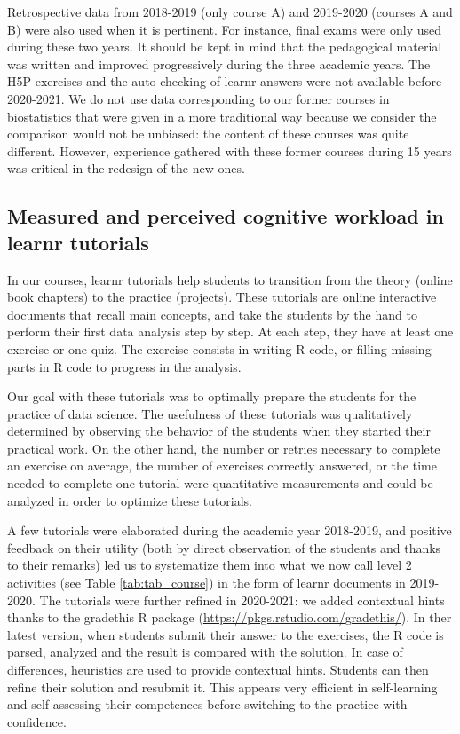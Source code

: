 \documentclass{aims}
\theoremstyle{definition}
\begin{document}
Retrospective data from 2018-2019 (only course A)
\cite{Grosjeandataset2018} and 2019-2020 (courses A and B)
\cite{Grosjeandataset2019} were also used when it is pertinent. For
instance, final exams were only used during these two years. It should
be kept in mind that the pedagogical material was written and improved
progressively during the three academic years. The H5P exercises and the
auto-checking of learnr answers were not available before 2020-2021. We
do not use data corresponding to our former courses in biostatistics
that were given in a more traditional way because we consider the
comparison would not be unbiased: the content of these courses was quite
different. However, experience gathered with these former courses during
15 years was critical in the redesign of the new ones.

\hypertarget{measured-and-perceived-cognitive-workload-in-learnr-tutorials-1}{%
\subsection{Measured and perceived cognitive workload in learnr
tutorials}\label{measured-and-perceived-cognitive-workload-in-learnr-tutorials-1}}

In our courses, learnr tutorials help students to transition from the
theory (online book chapters) to the practice (projects). These
tutorials are online interactive documents that recall main concepts,
and take the students by the hand to perform their first data analysis
step by step. At each step, they have at least one exercise or one quiz.
The exercise consists in writing R code, or filling missing parts in R
code to progress in the analysis.

Our goal with these tutorials was to optimally prepare the students for
the practice of data science. The usefulness of these tutorials was
qualitatively determined by observing the behavior of the students when
they started their practical work. On the other hand, the number or
retries necessary to complete an exercise on average, the number of
exercises correctly answered, or the time needed to complete one
tutorial were quantitative measurements and could be analyzed in order
to optimize these tutorials.

A few tutorials were elaborated during the academic year 2018-2019, and
positive feedback on their utility (both by direct observation of the
students and thanks to their remarks) led us to systematize them into
what we now call level 2 activities (see Table \ref {tab:tab_course}) in
the form of learnr documents in 2019-2020. The tutorials were further
refined in 2020-2021: we added contextual hints thanks to the gradethis
R package (\url{https://pkgs.rstudio.com/gradethis/}). In ther latest
version, when students submit their answer to the exercises, the R code
is parsed, analyzed and the result is compared with the solution. In
case of differences, heuristics are used to provide contextual hints.
Students can then refine their solution and resubmit it. This appears
very efficient in self-learning and self-assessing their competences
before switching to the practice with confidence.
\end{document}
